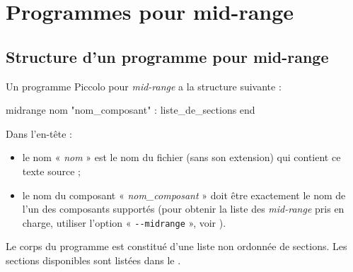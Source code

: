 
\cleardoublepage

\chapter{Programmes pour mid-range}

\thispagestyle{empty}




\section{Structure d’un programme pour mid-range}

Un programme Piccolo pour \emph{mid-range} a la structure suivante :

\begin{piccolo}
midrange nom "nom_composant" :
  liste_de_sections
end
\end{piccolo}


Dans l’en-tête :
\begin{itemize}
  \item le nom « \emph{nom} » est le nom du fichier (sans son extension) qui contient ce texte source ;
  \item le nom du composant « \emph{nom\_composant} » doit être exactement le nom de l’un des composants supportés (pour obtenir la liste des \emph{mid-range} pris en charge, utiliser l’option « \texttt{-{}-midrange} », voir ).
\end{itemize}


Le corps du programme est constitué d’une liste non ordonnée de sections. Les sections disponibles sont listées dans le .

